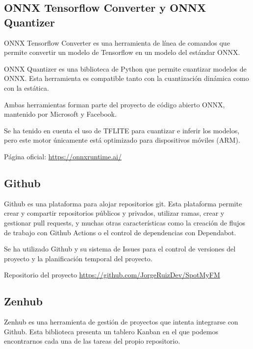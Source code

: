 \hypertarget{onnx-tensorflow-converter-y-onnx-quantizer}{%
\subsection{ONNX Tensorflow Converter y ONNX
Quantizer}\label{onnx-tensorflow-converter-y-onnx-quantizer}}

ONNX Tensorflow Converter \cite{onnxruntime} es una herramienta de línea de comandos que
permite convertir un modelo de Tensorflow en un modelo del estándar
ONNX.

ONNX Quantizer es una biblioteca de Python que permite cuantizar modelos
de ONNX. Esta herramienta es compatible tanto con la cuantización
dinámica como con la estática.

Ambas herramientas forman parte del proyecto de código abierto ONNX,
mantenido por Microsoft y Facebook.

Se ha tenido en cuenta el uso de TFLITE para cuantizar e inferir los modelos,
pero este motor únicamente está optimizado para dispositivos móviles
(ARM).

Página oficial: \href{https://onnxruntime.ai/}{https://onnxruntime.ai/}

\hypertarget{github}{%
\subsection{Github}\label{github}}

Github es una plataforma para alojar repositorios git. Esta plataforma
permite crear y compartir repositorios públicos y privados, utilizar
ramas, crear y gestionar pull requests, y muchas otras características
como la creación de flujos de trabajo con Github Actions o el control de
dependencias con Dependabot.

Se ha utilizado Github y su sistema de Issues para el control de
versiones del proyecto y la planificación temporal del proyecto.

Repositorio del proyecto \href{https://github.com/JorgeRuizDev/SpotMyFM}{https://github.com/JorgeRuizDev/SpotMyFM}

\hypertarget{zenhub}{%
\subsection{Zenhub}\label{zenhub}}

Zenhub es una herramienta de gestión de proyectos que intenta integrarse
con Github. Esta biblioteca presenta un tablero Kanban en el que podemos
encontrarnos cada una de las tareas del propio repositorio.

